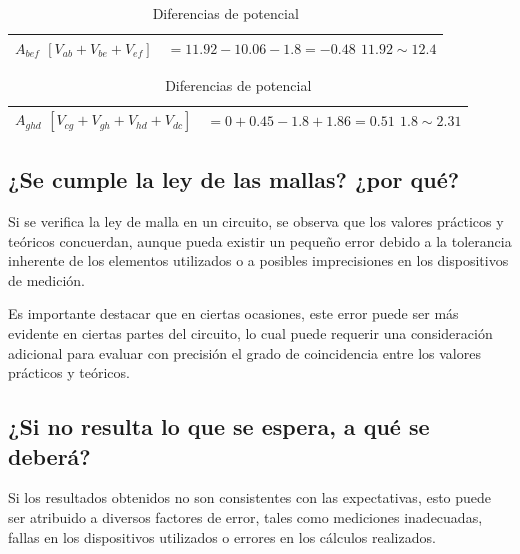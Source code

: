 \documentclass[twocolumn, 12pt]{article}
\begin{document}
\begin{table}[H]
    \begin{tabularx}{0.9\linewidth}{|>{\centering\arraybackslash}X|>{\centering\arraybackslash}X|}
        \hline
        $A_{bef}$ \linebreak $[V_{ab} + V_{be} + V_{ef}]$ &
        $= 11.92 - 10.06 - 1.8 = -0.48$ \linebreak
        $11.92 \sim 12.4$                                   \\\hline
    \end{tabularx}

    \begin{tabularx}{0.9\linewidth}{|>{\centering\arraybackslash}X|>{\centering\arraybackslash}X|}
        \hline
        $A_{ghd}$ \linebreak $[V_{cg} + V_{gh} + V_{hd} + V_{dc}]$ &
        $= 0 + 0.45 - 1.8 + 1.86 = 0.51$ \linebreak
        $1.8 \sim 2.31$                                              \\\hline
    \end{tabularx}

    \caption{Diferencias de potencial}

    \label{tab:analisisDatos__1}
\end{table}

\subsection{¿Se cumple la ley de las mallas? ¿por qué?}

Si se verifica la ley de malla en un circuito, se observa
que los valores prácticos y teóricos concuerdan, aunque
pueda existir un pequeño error debido a la tolerancia
inherente de los elementos utilizados o a posibles
imprecisiones en los dispositivos de medición.

Es importante destacar que en ciertas ocasiones, este error
puede ser más evidente en ciertas partes del circuito, lo
cual puede requerir una consideración adicional para
evaluar con precisión el grado de coincidencia entre los
valores prácticos y teóricos.

\subsection{¿Si no resulta lo que se espera, a qué se deberá?}

Si los resultados obtenidos no son consistentes con las
expectativas, esto puede ser atribuido a diversos factores
de error, tales como mediciones inadecuadas, fallas en los
dispositivos utilizados o errores en los cálculos
realizados.
\end{document}

